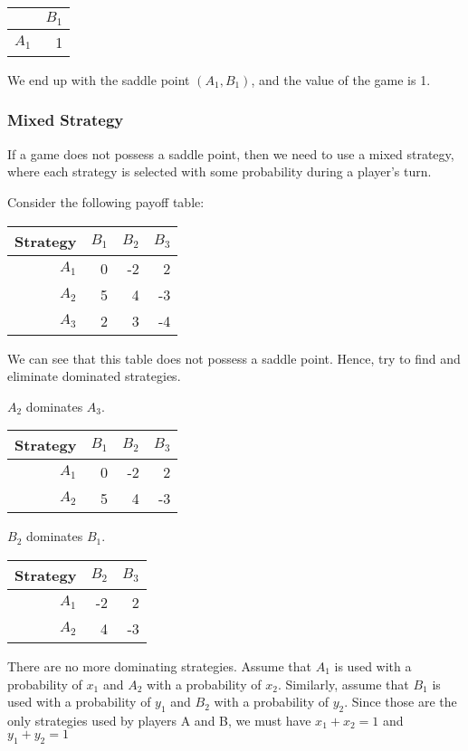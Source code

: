 \documentclass[12pt]{article}
\begin{document}
\begin{center}
\begin{tabular}{|r|r|}
\hline
        &  $B_1$  \\
\hline
 $A_1$  &      1  \\
\hline
\end{tabular}
\end{center}



We end up with the saddle point $\left(A_1,B_1\right)$, and the value of the game is 1.

\subsubsection{Mixed Strategy}
If a game does not possess a saddle point, then we need to use a mixed strategy, where each strategy is selected with some probability during a player's turn.

Consider the following payoff table:
\begin{center}
\begin{tabular}{|r|rrr|}
\hline
 Strategy     & $B_1$ & $B_2$ & $B_3$ \\
\hline
        $A_1$ & 0     & -2    & 2     \\
        $A_2$ & 5     & 4     & -3    \\
        $A_3$ & 2     & 3     & -4    \\
\hline
\end{tabular}
\end{center}
We can see that this table does not possess a saddle point. Hence, try to find and eliminate dominated strategies.

$A_2$ dominates $A_3$.
\begin{center}
\begin{tabular}{|r|rrr|}
\hline
 Strategy     & $B_1$ & $B_2$ & $B_3$ \\
\hline
        $A_1$ & 0     & -2    & 2     \\
        $A_2$ & 5     & 4     & -3    \\
\hline
\end{tabular}
\end{center}
$B_2$ dominates $B_1$.

\begin{center}
  \begin{tabular}{|r|rr|}
    \hline
    Strategy     & $B_2$ & $B_3$ \\
    \hline
    $A_1$ & -2    & 2     \\
    $A_2$ & 4     & -3    \\
    \hline
  \end{tabular}
\end{center}
There are no more dominating strategies. 
Assume that $A_1$ is used with a probability of $x_1$ and $A_2$ with a probability of $x_2$.
Similarly, assume that $B_1$ is used with a probability of $y_1$ and $B_2$ with a probability of $y_2$.
Since those are the only strategies used by players A and B, we must have $x_1+x_2=1$ and $y_1+y_2=1$
\end{document}
